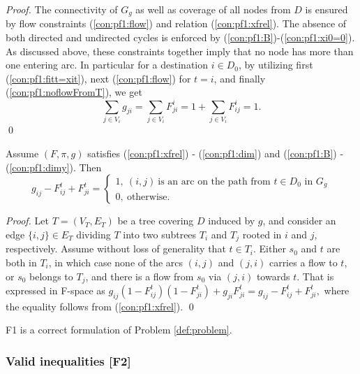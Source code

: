 \begin{proof}
The connectivity of $G_{g}$ as well as coverage of all nodes from $D$ is ensured by flow constraints (\ref{con:pf1:flow}) and relation (\ref{con:pf1:xfrel}).
The absence of both directed and undirected cycles is enforced by (\ref{con:pf1:B})-(\ref{con:pf1:xi0=0}).
As discussed above, these constraints together imply that no node has more than one entering arc.
In particular for a destination $i\in D_0$, by utilizing first (\ref{con:pf1:fitt=xit}), next (\ref{con:pf1:flow}) for $t=i$, and finally (\ref{con:pf1:noflowFromT}), we get
$$\sum_{j\in V_i}g_{ji}=\sum_{j\in V_i}F_{ji}^i = 1+\sum_{j\in V_i}F_{ij}^i=1.$$
\qed
\end{proof}

\begin{prop}\label{prop:transX}
Assume $(F,\pi,g)$ satisfies (\ref{con:pf1:xfrel}) - (\ref{con:pf1:dim}) and  (\ref{con:pf1:B}) - (\ref{con:pf1:dimy}). Then
$$
g_{ij} - F^t_{ij}+F^t_{ji} = 
	\begin{cases}
		1, ~(i,j)~\text{is an arc on the path from~$t\in D_0$ in $G_{g}$} \\
		0, ~\text{otherwise.}
	\end{cases}
$$
\end{prop}
%
\begin{proof}
Let $T=(V_T,E_T)$ be a tree covering $D$ induced by $g$, and consider an edge $\{i,j\}\in E_T$ dividing $T$ into two subtrees $T_i$ and $T_j$ rooted in $i$ and $j$, respectively.
Assume without loss of generality that $t\in T_i$.
Either $s_0$ and $t$ are both in $T_i$, in which case none of the arcs $(i,j)$ and $(j,i)$ carries a flow to $t$, or $s_0$ belongs to $T_j$, and there is a flow from $s_0$ via $(j,i)$ towards $t$.
That is expressed in F-space as
$
g_{ij}(1-F^{t}_{ij})(1-F^{t}_{ji})+g_{ji}F^{t}_{ji}=g_{ij} - F^t_{ij}+F^t_{ji},
$
where the equality follows from (\ref{con:pf1:xfrel}).
\qed
\end{proof}

\begin{cor}
F1 is a correct formulation of Problem \ref{def:problem}.
\end{cor}

\subsubsection{Valid inequalities [F2]}

